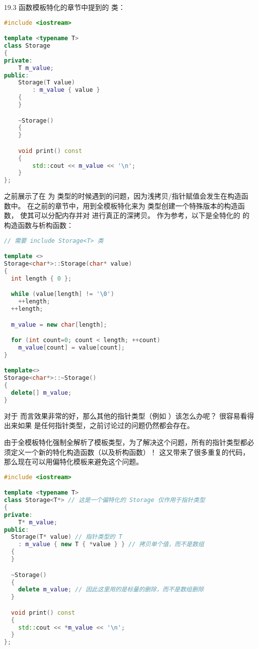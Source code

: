 \documentclass[../../LearnCpp.tex]{subfiles}
\begin{document}

19.3 函数模板特化的章节中提到的  类：

\begin{lstlisting}[language=C++]
#include <iostream>

template <typename T>
class Storage
{
private:
    T m_value;
public:
    Storage(T value)
        : m_value { value }
    {
    }

    ~Storage()
    {
    }

    void print() const
    {
        std::cout << m_value << '\n';
    }
};
\end{lstlisting}

之前展示了在  为  类型的时候遇到的问题，因为浅拷贝/指针赋值会发生在构造函数中。
在之前的章节中，用到全模板特化来为  类型创建一个特殊版本的构造函数，
使其可以分配内存并对  进行真正的深拷贝。
作为参考，以下是全特化的   的构造函数与析构函数：

\begin{lstlisting}[language=C++]
// 需要 include Storage<T> 类

template <>
Storage<char*>::Storage(char* value)
{
  int length { 0 };

  while (value[length] != '\0')
    ++length;
  ++length;

  m_value = new char[length];

  for (int count=0; count < length; ++count)
    m_value[count] = value[count];
}

template<>
Storage<char*>::~Storage()
{
  delete[] m_value;
}
\end{lstlisting}

对于  而言效果非常的好，那么其他的指针类型（例如 ）该怎么办呢？
很容易看得出来如果  是任何指针类型，之前讨论过的问题仍然都会存在。

由于全模板特化强制全解析了模板类型，为了解决这个问题，所有的指针类型都必须定义一个新的特化构造函数（以及析构函数）！
这又带来了很多重复的代码，那么现在可以用偏特化模板来避免这个问题。

\begin{lstlisting}[language=C++]
#include <iostream>

template <typename T>
class Storage<T*> // 这是一个偏特化的 Storage 仅作用于指针类型
{
private:
    T* m_value;
public:
  Storage(T* value) // 指针类型的 T
    : m_value { new T { *value } } // 拷贝单个值，而不是数组
  {
  }

  ~Storage()
  {
    delete m_value; // 因此这里用的是标量的删除，而不是数组删除
  }

  void print() const
  {
    std::cout << *m_value << '\n';
  }
};
\end{lstlisting}
\end{document}
